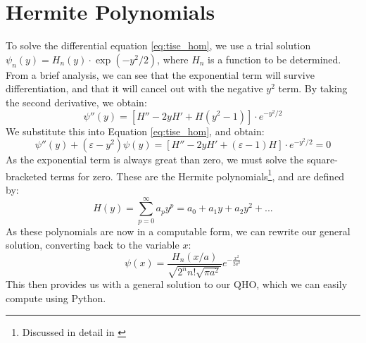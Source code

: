 \documentclass[a4paper]{article}
\begin{document}
\section{Hermite Polynomials}
To solve the differential equation \ref{eq:tise_hom}, we use a trial solution  $\psi_n(y)=H_n(y)\cdot\exp(-y^2/2)$, where $H_n$ is a function to be determined. From a brief analysis, we can see that the exponential term will survive differentiation, and that it will cancel out with the negative $y^2$ term. By  taking the second derivative, we obtain:
\begin{equation}
\psi''(y)=[H''-2yH'+H(y^2-1)]\cdot e^{-y^2/2}
\end{equation}
We substitute this into Equation \ref{eq:tise_hom}, and obtain:
\begin{equation}
\psi''(y)+(\varepsilon-y^2)\psi(y)=[H''-2yH'+(\varepsilon-1)H]\cdot e^{-y^2/2}=0
\end{equation}
As the exponential term is always great than zero, we must solve the square-bracketed terms for zero. These are the Hermite polynomials\footnote{Discussed in detail in \cite[\S1T1 $\sim$ p.57 ]{RefWorks:doc:606076f48f081b19e4859e9a}}, and are defined by:
\begin{equation}
H(y)=\sum^\infty_{p=0}a_py^p=a_0+a_1y+a_2y^2+...
\end{equation}
As these polynomials are now in a computable form, we can rewrite our general solution, converting back to the variable $x$:
\begin{equation}
\psi(x)=\frac{H_n(x/a)}{\sqrt{2^nn!\sqrt{\pi a^2}}}e^{-\frac{x^2}{2a^2}}
\end{equation}
This then provides us with a general solution to our QHO, which we can easily compute using Python.
\end{document}
